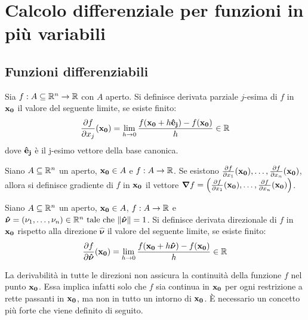 \chapter{Calcolo differenziale per funzioni in più variabili}\label{chap:nvars}

\section{Funzioni differenziabili}

\begin{definition}
    Sia $f: A \subseteq \mathbb{R}^n \to \mathbb{R}$ con $A$ aperto. Si definisce derivata parziale $j$-esima di $f$ in $\vb{x_0}$ il valore del seguente limite, se esiste finito:
    $$
        \frac{\partial f}{\partial x_j} (\vb{x_0}) = \displaystyle \lim_{h\to 0} \frac{f(\vb{x_0} + h\vb{\hat{e}_j}) - f(\vb{x_0})}{h} \in \mathbb{R}
    $$
    dove $\vb{\hat{e}_j}$ è il j-esimo vettore della base canonica.
\end{definition}

\begin{definition}
    [Gradiente]
    Siano $A \subseteq \mathbb{R}^n$ un aperto, $\vb{x_0} \in A$ e $f:A \to \mathbb{R}$. Se esistono $\frac{\partial f}{\partial x_1}(\vb{x_0}),\dots,\\\frac{\partial f}{\partial x_n}(\vb{x_0})$, allora si definisce gradiente di $f$ in $\vb{x_0}$ il vettore $\bm{\nabla}f = \left( \frac{\partial f}{\partial x_1} (\vb{x_0}), \dots, \frac{\partial f}{\partial x_n}(\vb{x_0}) \right)$.
\end{definition}

\begin{definition}
    Siano $A \subseteq \mathbb{R}^n$ un aperto, $\vb{x_0} \in A$, $f:A \to \mathbb{R}$ e $\bm{\hat{\nu}} = (\nu_1,\dots,\nu_n) \in \mathbb{R}^n \text{ tale che } \norm{\bm{\hat{\nu}}}=1$. Si definisce derivata direzionale di $f$ in $\vb{x_0}$ rispetto alla direzione $\bm{\hat{\nu}}$ il valore del seguente limite, se esiste finito:
    $$
        \frac{\partial f}{\partial \bm{\hat{\nu}}} (\vb{x_0}) = \displaystyle \lim_{h\to 0} \frac{f(\vb{x_0} + h\bm{\hat{\nu}}) - f(\vb{x_0})}{h} \in \mathbb{R}
    $$
\end{definition}

\begin{remark}
    La derivabilità in tutte le direzioni non assicura la continuità della funzione $f$ nel punto $\vb{x_0}$. Essa implica infatti solo che $f$ sia continua in $\vb{x_0}$ per ogni restrizione a rette passanti in $\vb{x_0}$, ma non in tutto un intorno di $\vb{x_0}$. È necessario un concetto più forte che viene definito di seguito.
\end{remark}

